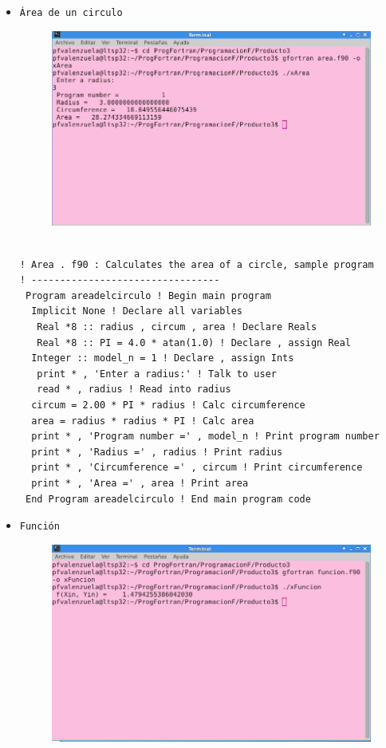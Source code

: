 \documentclass[12pt]{article}
\begin{document}
\begin{itemize}
\item {\tt Área de un circulo} 
\begin{figure}[h]
\centering
\includegraphics[scale=0.5]{area.png}
\end{figure}
\begin{verbatim}

! Area . f90 : Calculates the area of a circle, sample program
! ---------------------------------
 Program areadelcirculo ! Begin main program
  Implicit None ! Declare all variables
   Real *8 :: radius , circum , area ! Declare Reals
   Real *8 :: PI = 4.0 * atan(1.0) ! Declare , assign Real
  Integer :: model_n = 1 ! Declare , assign Ints
   print * , 'Enter a radius:' ! Talk to user
   read * , radius ! Read into radius
  circum = 2.00 * PI * radius ! Calc circumference
  area = radius * radius * PI ! Calc area
  print * , 'Program number =' , model_n ! Print program number
  print * , 'Radius =' , radius ! Print radius
  print * , 'Circumference =' , circum ! Print circumference
  print * , 'Area =' , area ! Print area
 End Program areadelcirculo ! End main program code
 \end{verbatim}

\item {\tt Función}
\begin{figure}[h]
\centering
\includegraphics[scale=0.5]{funcion.png}
\end{figure}
\begin{verbatim}
 

\end{verbatim}
\end{itemize}
\end{document}
